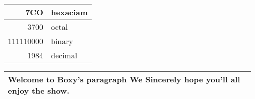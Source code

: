 \documentclass[UTF8]{article}
\begin{document}
\begin{tabular}{|r|l|}
\hline
7CO & hexaciam \\
\hline
3700 & octal \\ 
\hline
111110000 & binary \\
\hline
1984 & decimal \\
\hline
\end{tabular}

\begin{tabular}{|p{2cm}|}
\hline
Welcome to Boxy's paragraph
We Sincerely hope you'll 
all enjoy the show.\\
\hline
\end{tabular}
\end{document}
